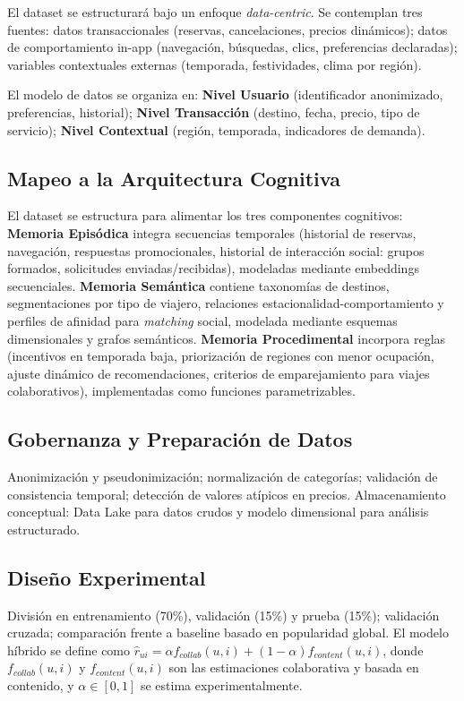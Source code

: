 \documentclass[12pt, letterpaper]{article}
\begin{document}
El dataset se estructurará bajo un enfoque \textit{data-centric}. Se contemplan tres fuentes: datos transaccionales (reservas, cancelaciones, precios dinámicos); datos de comportamiento in-app (navegación, búsquedas, clics, preferencias declaradas); variables contextuales externas (temporada, festividades, clima por región).

El modelo de datos se organiza en: \textbf{Nivel Usuario} (identificador anonimizado, preferencias, historial); \textbf{Nivel Transacción} (destino, fecha, precio, tipo de servicio); \textbf{Nivel Contextual} (región, temporada, indicadores de demanda).

\subsection{Mapeo a la Arquitectura Cognitiva}

El dataset se estructura para alimentar los tres componentes cognitivos: \textbf{Memoria Episódica} integra secuencias temporales (historial de reservas, navegación, respuestas promocionales, historial de interacción social: grupos formados, solicitudes enviadas/recibidas), modeladas mediante embeddings secuenciales. \textbf{Memoria Semántica} contiene taxonomías de destinos, segmentaciones por tipo de viajero, relaciones estacionalidad-comportamiento y perfiles de afinidad para \textit{matching} social, modelada mediante esquemas dimensionales y grafos semánticos. \textbf{Memoria Procedimental} incorpora reglas (incentivos en temporada baja, priorización de regiones con menor ocupación, ajuste dinámico de recomendaciones, criterios de emparejamiento para viajes colaborativos), implementadas como funciones parametrizables.

\subsection{Gobernanza y Preparación de Datos}

Anonimización y pseudonimización; normalización de categorías; validación de consistencia temporal; detección de valores atípicos en precios. Almacenamiento conceptual: Data Lake para datos crudos y modelo dimensional para análisis estructurado.

\subsection{Diseño Experimental}

División en entrenamiento (70\%), validación (15\%) y prueba (15\%); validación cruzada; comparación frente a baseline basado en popularidad global. El modelo híbrido se define como $\hat{r}_{ui} = \alpha f_{collab}(u,i) + (1-\alpha) f_{content}(u,i)$, donde $f_{collab}(u,i)$ y $f_{content}(u,i)$ son las estimaciones colaborativa y basada en contenido, y $\alpha \in [0,1]$ se estima experimentalmente.
\end{document}
